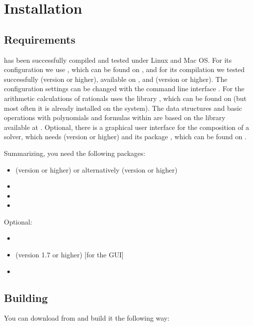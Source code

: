 \chapter{Installation}
\label{chapter:installation}
\section{Requirements}
\smtrat has been successfully compiled and tested under Linux and Mac OS. For its configuration we use \cmake, which can be found on \cmakeURL, and for its compilation we tested successfully \gcc (version \gccVersion or higher), available on \gccURL, and \clang (version \clangVersion or higher). The configuration settings can be changed with the command line interface \ccmake. For the arithmetic calculations of rationals \smtrat uses the \Cpp library \Gmp, which can be found on \gmpURL  (but most often it is already installed on the system). The data structures and basic operations with polynomials and formulas within \smtrat are based on the \Cpp library \carl available at \carlURL. Optional, there is a graphical user interface for the composition of a solver, which needs \java (version \javaVersion or higher) and its package \ant, which can be found on \antURL. 

Summarizing, you need the following packages:
\begin{itemize}
	\item \gcc (version \gccVersion or higher) or alternatively \clang (version \clangVersion or higher)
	\item \cmake
	\item \Gmp
	\item \Carl 
\end{itemize}

Optional:
\begin{itemize}
	\item {}
	\item \java (version 1.7 or higher) [for the GUI]
	\item {}
\end{itemize}


\section{Building %
	     \smtrat}
You can download \smtrat from \smtratURL and build it the following way:

